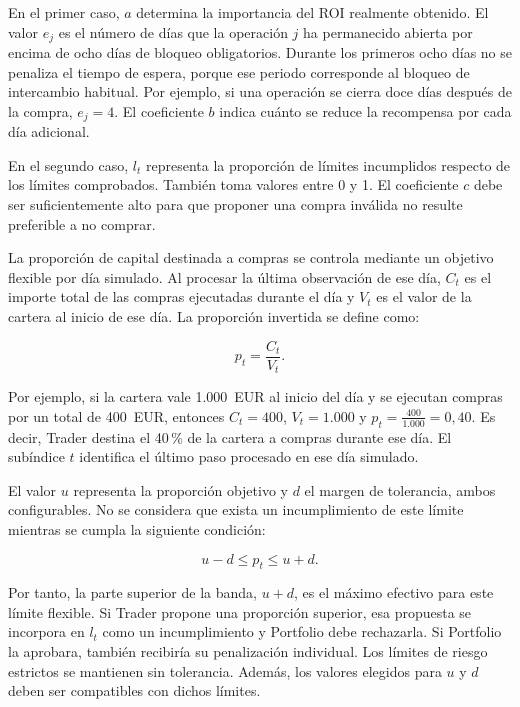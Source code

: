 En el primer caso, $a$ determina la importancia del ROI realmente obtenido. El valor $e_j$ es el número de días que la operación $j$ ha permanecido abierta por encima de ocho días de bloqueo obligatorios. Durante los primeros ocho días no se penaliza el tiempo de espera, porque ese periodo corresponde al bloqueo de intercambio habitual. Por ejemplo, si una operación se cierra doce días después de la compra, $e_j=4$. El coeficiente $b$ indica cuánto se reduce la recompensa por cada día adicional.

En el segundo caso, $l_t$ representa la proporción de límites incumplidos respecto de los límites comprobados. También toma valores entre 0 y 1. El coeficiente $c$ debe ser suficientemente alto para que proponer una compra inválida no resulte preferible a no comprar.

La proporción de capital destinada a compras se controla mediante un objetivo flexible por día simulado. Al procesar la última observación de ese día, $C_t$ es el importe total de las compras ejecutadas durante el día y $V_t$ es el valor de la cartera al inicio de ese día. La proporción invertida se define como:

\begin{equation}
p_t=\frac{C_t}{V_t}.
\label{eq:proporcion-invertida}
\end{equation}

Por ejemplo, si la cartera vale 1.000~EUR al inicio del día y se ejecutan compras por un total de 400~EUR, entonces $C_t=400$, $V_t=1.000$ y $p_t=\frac{400}{1.000}=0{,}40$. Es decir, Trader destina el 40\,\% de la cartera a compras durante ese día. El subíndice $t$ identifica el último paso procesado en ese día simulado.

El valor $u$ representa la proporción objetivo y $d$ el margen de tolerancia, ambos configurables. No se considera que exista un incumplimiento de este límite mientras se cumpla la siguiente condición:

\begin{equation}
u-d\leq p_t\leq u+d.
\label{eq:banda-inversion}
\end{equation}

Por tanto, la parte superior de la banda, $u+d$, es el máximo efectivo para este límite flexible. Si Trader propone una proporción superior, esa propuesta se incorpora en $l_t$ como un incumplimiento y Portfolio debe rechazarla. Si Portfolio la aprobara, también recibiría su penalización individual. Los límites de riesgo estrictos se mantienen sin tolerancia. Además, los valores elegidos para $u$ y $d$ deben ser compatibles con dichos límites.

